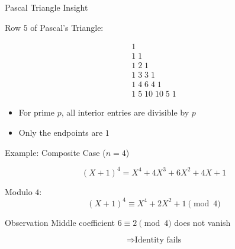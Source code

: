 \documentclass{beamer}
\begin{document}

\begin{frame}{Pascal Triangle Insight}

Row $5$ of Pascal's Triangle:

\[
\begin{array}{c}
1 \\
1\;1 \\
1\;2\;1 \\
1\;3\;3\;1 \\
1\;4\;6\;4\;1 \\
1\;5\;10\;10\;5\;1
\end{array}
\]

\begin{itemize}
    \item For prime $p$, all interior entries are divisible by $p$
    \item Only the endpoints are $1$
\end{itemize}

\end{frame}


\begin{frame}{Example: Composite Case ($n=4$)}

\[
(X+1)^4 = X^4 + 4X^3 + 6X^2 + 4X + 1
\]


Modulo $4$:
\[
(X+1)^4 \equiv X^4 + 2X^2 + 1 \pmod{4}
\]


\begin{block}{Observation}
Middle coefficient $6 \equiv 2 \pmod{4}$ does not vanish
\end{block}

\vspace{0.5em}

\[
\Rightarrow \text{Identity fails}
\]

\end{frame}
\end{document}
